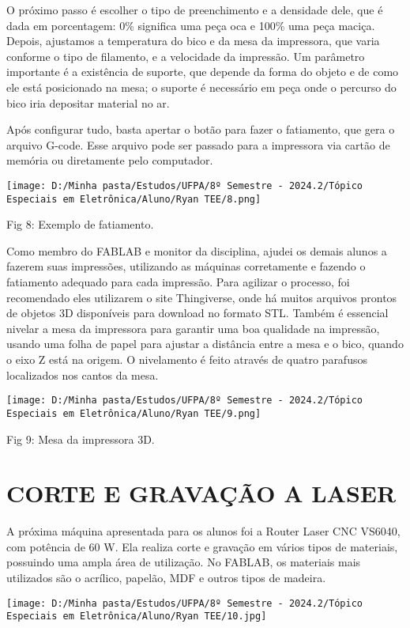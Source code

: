 \documentclass[
]{book}
\begin{document}
O próximo passo é escolher o tipo de preenchimento e a densidade dele, que é dada em porcentagem: 0\% significa uma peça oca e 100\% uma peça maciça. Depois, ajustamos a temperatura do bico e da mesa da impressora, que varia conforme o tipo de filamento, e a velocidade da impressão. Um parâmetro importante é a existência de suporte, que depende da forma do objeto e de como ele está posicionado na mesa; o suporte é necessário em peça onde o percurso do bico iria depositar material no ar.

Após configurar tudo, basta apertar o botão para fazer o fatiamento, que gera o arquivo G-code. Esse arquivo pode ser passado para a impressora via cartão de memória ou diretamente pelo computador.

\texttt{[image: D:/Minha pasta/Estudos/UFPA/8º Semestre - 2024.2/Tópico Especiais em Eletrônica/Aluno/Ryan TEE/8.png]}

Fig 8: Exemplo de fatiamento.

Como membro do FABLAB e monitor da disciplina, ajudei os demais alunos a fazerem suas impressões, utilizando as máquinas corretamente e fazendo o fatiamento adequado para cada impressão. Para agilizar o processo, foi recomendado eles utilizarem o site Thingiverse, onde há muitos arquivos prontos de objetos 3D disponíveis para download no formato STL. Também é essencial nivelar a mesa da impressora para garantir uma boa qualidade na impressão, usando uma folha de papel para ajustar a distância entre a mesa e o bico, quando o eixo Z está na origem. O nivelamento é feito através de quatro parafusos localizados nos cantos da mesa.

\texttt{[image: D:/Minha pasta/Estudos/UFPA/8º Semestre - 2024.2/Tópico Especiais em Eletrônica/Aluno/Ryan TEE/9.png]}

Fig 9: Mesa da impressora 3D.

\chapter{CORTE E GRAVAÇÃO A LASER}\label{corte-e-gravauxe7uxe3o-a-laser}

A próxima máquina apresentada para os alunos foi a Router Laser CNC VS6040, com potência de 60 W. Ela realiza corte e gravação em vários tipos de materiais, possuindo uma ampla área de utilização. No FABLAB, os materiais mais utilizados são o acrílico, papelão, MDF e outros tipos de madeira.

\texttt{[image: D:/Minha pasta/Estudos/UFPA/8º Semestre - 2024.2/Tópico Especiais em Eletrônica/Aluno/Ryan TEE/10.jpg]}
\end{document}
